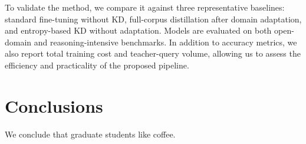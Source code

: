 \documentclass[draft]{uiucthesis2021}
\newcounter{counterforappendices}
\begin{document}
To validate the method, we compare it against three representative baselines: standard fine-tuning without KD, full-corpus distillation after domain adaptation, and entropy-based KD without adaptation. Models are evaluated on both open-domain and reasoning-intensive benchmarks. In addition to accuracy metrics, we also report total training cost and teacher-query volume, allowing us to assess the efficiency and practicality of the proposed pipeline.



\chapter{Conclusions}

We conclude that graduate students like coffee.


\backmatter

\printbibliography[heading=bibintoc,title={References}]








% 
\end{document}
